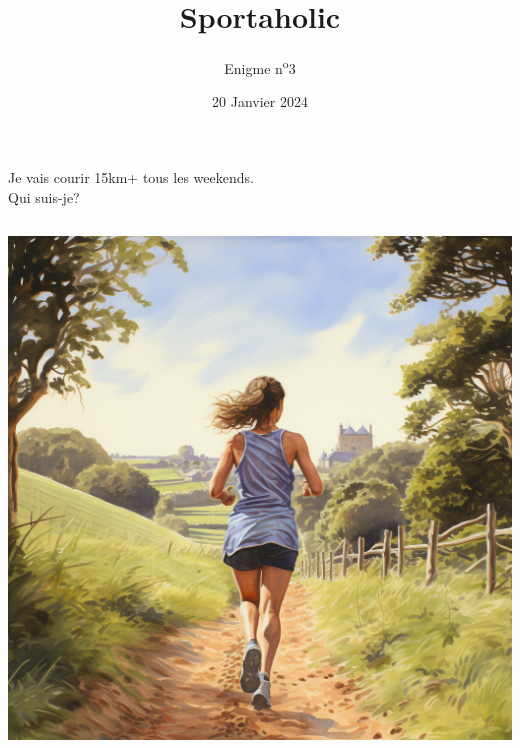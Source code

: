 \documentclass[a4paper, top=10mm]{article}
\title{\textbf{\huge{Sportaholic}}}
\author{Enigme n\textsuperscript{o}3}
\date{20 Janvier 2024}
\begin{document}
	\maketitle
	
	\huge
	Je vais courir 15km+ tous les weekends.\\
	Qui suis-je?
	
	\vspace{3cm}
	
	\begin{center}
		\includegraphics[height=400pt]{03sportaholic.png}
	\end{center}
	
\end{document}
